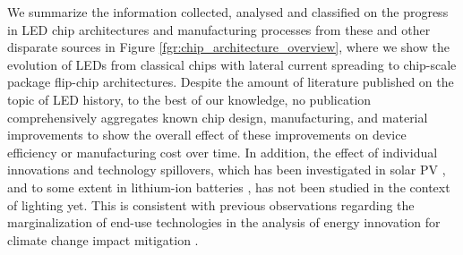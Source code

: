\documentclass[twoside,twocolumn,9pt]{article}
\begin{document}
We summarize the information collected, analysed and classified on the progress in LED chip architectures and manufacturing processes from these and other disparate sources in Figure \ref{fgr:chip_architecture_overview}, where we show the evolution of LEDs from classical chips with lateral current spreading to chip-scale package flip-chip architectures. Despite the amount of literature published on the topic of LED history, to the best of our knowledge, no publication comprehensively aggregates known chip design, manufacturing, and material improvements to show the overall effect of these improvements on device efficiency or manufacturing cost over time. In addition, the effect of individual innovations and technology spillovers, which has been investigated in solar PV \cite{kavlak2018evaluating}\cite{kolesnikov2020novel}\cite{nemet2019solar}, and to some extent in lithium-ion batteries \cite{Stephan2021}, has not been studied in the context of lighting yet. This is consistent with previous observations regarding the marginalization of end-use technologies in the analysis of energy innovation for climate change impact mitigation \cite{Wilson2012}\cite{Creutzig2018}.
\end{document}

